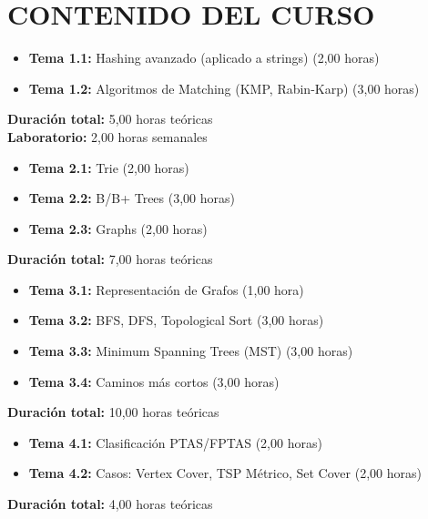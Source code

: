 \documentclass[12pt,a4paper]{article}
\begin{document}
\section{CONTENIDO DEL CURSO}

\begin{tcolorbox}[colback=white,colframe=pucpAzul,title=\textbf{UNIDAD 1: Strings}]
\begin{itemize}[leftmargin=*]
    \item \textbf{Tema 1.1:} Hashing avanzado (aplicado a strings) (2,00 horas)
    \item \textbf{Tema 1.2:} Algoritmos de Matching (KMP, Rabin-Karp) (3,00 horas)
\end{itemize}
\textbf{Duración total:} 5,00 horas teóricas \\
\textbf{Laboratorio:} 2,00 horas semanales
\end{tcolorbox}

\begin{tcolorbox}[colback=white,colframe=pucpAzul,title=\textbf{UNIDAD 2: Estructuras de Datos Avanzadas}]
\begin{itemize}[leftmargin=*]
    \item \textbf{Tema 2.1:} Trie (2,00 horas)
    \item \textbf{Tema 2.2:} B/B+ Trees (3,00 horas)
    \item \textbf{Tema 2.3:} Graphs (2,00 horas)
\end{itemize}
\textbf{Duración total:} 7,00 horas teóricas
\end{tcolorbox}

\begin{tcolorbox}[colback=white,colframe=pucpAzul,title=\textbf{UNIDAD 3: Algoritmos en Grafos}]
\begin{itemize}[leftmargin=*]
    \item \textbf{Tema 3.1:} Representación de Grafos (1,00 hora)
    \item \textbf{Tema 3.2:} BFS, DFS, Topological Sort (3,00 horas)
    \item \textbf{Tema 3.3:} Minimum Spanning Trees (MST) (3,00 horas)
    \item \textbf{Tema 3.4:} Caminos más cortos (3,00 horas)
\end{itemize}
\textbf{Duración total:} 10,00 horas teóricas
\end{tcolorbox}

\begin{tcolorbox}[colback=white,colframe=pucpAzul,title=\textbf{UNIDAD 4: Problemas Computacionalmente Complejos}]
\begin{itemize}[leftmargin=*]
    \item \textbf{Tema 4.1:} Clasificación PTAS/FPTAS (2,00 horas)
    \item \textbf{Tema 4.2:} Casos: Vertex Cover, TSP Métrico, Set Cover (2,00 horas)
\end{itemize}
\textbf{Duración total:} 4,00 horas teóricas
\end{tcolorbox}
\end{document}
